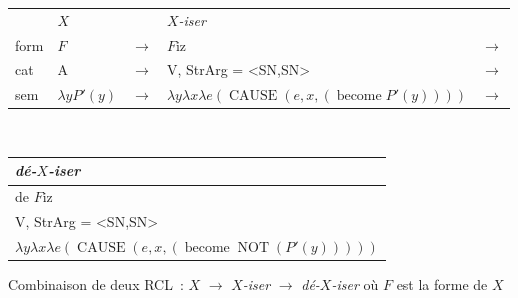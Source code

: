 \documentclass[output=paper]{langsci/langscibook}
\begin{document}
\begin{figure}

\begin{tabular}[t]{l|l|l|l|l}
\multicolumn{1}{l}{} &  \multicolumn{1}{l}{$X$} & \multicolumn{1}{l}{} & \multicolumn{1}{l}{\emph{$X$-iser}}\\
\cline{2-2}\cline{4-4}
form & $F$ &  $\rightarrow$ & $F$iz%
 &  $\rightarrow$\\
\cline{2-2}\cline{4-4}
cat & A & $\rightarrow$ & V, StrArg = <SN,SN> &  $\rightarrow$\\
\cline{2-2}\cline{4-4}
sem & $\lambda y P'(y)$ & $\rightarrow$ & $\lambda y \lambda x \lambda e (\operatorname{CAUSE} (e, x, (\operatorname{become} P'(y))))$ & $\rightarrow$\\
\cline{2-2}\cline{4-4}
\end{tabular}\\
\mbox{}\hfill%
\begin{tabular}[t]{|l|}
 \multicolumn{1}{l}{\emph{dé-$X$-iser}}\\
\hline
de%
$F$iz%
\\
\hline
V, StrArg = <SN,SN>\\
\hline
$\lambda y \lambda x \lambda e (\operatorname{CAUSE} (e, x, (\operatorname{become} \operatorname{NOT}(P'(y)))))$\\
\hline
\end{tabular}

\caption{Combinaison de deux RCL~: \protect$X$\protect{} \protect$\rightarrow$ \emph{\mbox{\protect$X$-iser}}\protect{} \protect$\rightarrow$ \emph{\mbox{dé-\protect$X$-iser}}\protect{} où \protect$F$ est la forme de \protect$X$}
\label{fig:deXiser2}
\end{figure}
\end{document}
